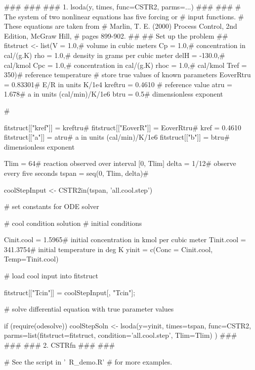 \documentclass{article}
\begin{document}
\begin{SeeAlso}\relax
{}
\end{SeeAlso}
\begin{Examples}
\begin{ExampleCode}
###
###
### 1.  lsoda(y, times, func=CSTR2, parms=...)
###
###
#  The system of two nonlinear equations has five forcing or  
#  input functions.
#  These equations are taken from
#  Marlin, T. E. (2000) Process Control, 2nd Edition, McGraw Hill,
#  pages 899-902.
##
##  Set up the problem 
##
fitstruct <- list(V    = 1.0,#  volume in cubic meters 
                  Cp   = 1.0,#  concentration in cal/(g.K)
                  rho  = 1.0,#  density in grams per cubic meter 
                  delH = -130.0,# cal/kmol
                  Cpc  = 1.0,#  concentration in cal/(g.K)
                  rhoc = 1.0,#  cal/kmol
                  Tref = 350)#  reference temperature
#  store true values of known parameters 
EoverRtru = 0.83301#   E/R in units K/1e4
kreftru   = 0.4610 #   reference value
atru      = 1.678#     a in units (cal/min)/K/1e6
btru      = 0.5#       dimensionless exponent

#

fitstruct[["kref"]]   = kreftru#      
fitstruct[["EoverR"]] = EoverRtru#  kref = 0.4610
fitstruct[["a"]]      = atru#       a in units (cal/min)/K/1e6
fitstruct[["b"]]      = btru#       dimensionless exponent
 
Tlim  = 64#    reaction observed over interval [0, Tlim]
delta = 1/12#  observe every five seconds
tspan = seq(0, Tlim, delta)#

coolStepInput <- CSTR2in(tspan, 'all.cool.step')

#  set constants for ODE solver

#  cool condition solution
#  initial conditions

Cinit.cool = 1.5965#  initial concentration in kmol per cubic meter
Tinit.cool = 341.3754# initial temperature in deg K
yinit = c(Conc = Cinit.cool, Temp=Tinit.cool)

#  load cool input into fitstruct

fitstruct[["Tcin"]] = coolStepInput[, "Tcin"];

#  solve  differential equation with true parameter values

if (require(odesolve)) {
coolStepSoln <- lsoda(y=yinit, times=tspan, func=CSTR2,
  parms=list(fitstruct=fitstruct, condition='all.cool.step', Tlim=Tlim) )
}
###
###
### 2.  CSTRfn 
###
###

# See the script in '~R\library\fda\scripts\CSTR\CSTR_demo.R'
#  for more examples.  

\end{ExampleCode}
\end{Examples}
\end{document}
